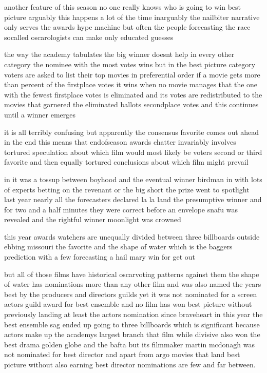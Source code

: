 {another feature of this season no one really knows who is going to win best
picture arguably this happens a lot of the time inarguably the nailbiter
narrative only serves the awards hype machine but often the people forecasting
the race socalled oscarologists can make only educated guesses

the way the academy tabulates the big winner doesnt help in every other
category the nominee with the most votes wins but in the best picture
category voters are asked to list their top movies in preferential order if a
movie gets more than  percent of the firstplace votes it wins when no
movie manages that the one with the fewest firstplace votes is eliminated and
its votes are redistributed to the movies that garnered the eliminated ballots
secondplace votes and this continues until a winner emerges

it is all terribly confusing but apparently the consensus favorite comes out
ahead in the end this means that endofseason awards chatter invariably
involves tortured speculation about which film would most likely be voters
second or third favorite and then equally tortured conclusions about which
film might prevail

in  it was a tossup between boyhood and the eventual winner birdman
in  with lots of experts betting on the revenant or the big short the
prize went to spotlight last year nearly all the forecasters declared la
la land the presumptive winner and for two and a half minutes they were
correct before an envelope snafu was revealed and the rightful winner
moonlight was crowned

this year awards watchers are unequally divided between three billboards
outside ebbing missouri the favorite and the shape of water which is
the baggers prediction with a few forecasting a hail mary win for get out

but all of those films have historical oscarvoting patterns against them the
shape of water has  nominations more than any other film and was also
named the years best by the producers and directors guilds yet it was not
nominated for a screen actors guild award for best ensemble and no film has
won best picture without previously landing at least the actors nomination
since braveheart in  this year the best ensemble sag ended up going to
three billboards which is significant because actors make up the academys
largest branch that film while divisive also won the best drama golden globe
and the bafta but its filmmaker martin mcdonagh was not nominated for best
director and apart from argo movies that land best picture without also
earning best director nominations are few and far between.}

